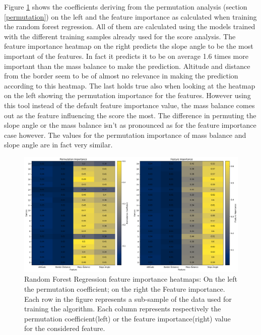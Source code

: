 Figure \ref{fig:rfr-heatmap} shows the coefficients deriving from the permutation analysis (section \ref{permutation}) on the left and the feature importance as calculated when training the random forest regression. All of them are calculated using the models trained with the different training samples already used for the score analysis. The feature importance heatmap on the right predicts the slope angle to be the most important of the features. In fact it predicts it to be on average 1.6 times more important than the mass balance to make the prediction. Altitude and distance from the border seem to be of almost no relevance in making the prediction according to this heatmap. The last holds true also when looking at the heatmap on the left showing the permutation importance for the features. However using this tool instead of the default feature importance value, the mass balance comes out as the feature influencing the score the most. The difference in permuting the slope angle or the mass balance isn't as pronounced as for the feature importance case however. The values for the permutation importance of mass balance and slope angle are in fact very similar.

\begin{figure}[!tp]
	\centering		  
	\includegraphics[width=1.\textwidth]{figures/RFR_heatmap.pdf}
	\caption{Random Forest Regression feature importance heatmaps: On the left the permutation coefficient; on the right the Feature importance. Each row in the figure represents a sub-sample of the data used for training the algorithm. Each column represents respectively the permutation coefficient(left) or the feature importance(right) value for the considered feature.}
	\label{fig:rfr-heatmap}
\end{figure}

